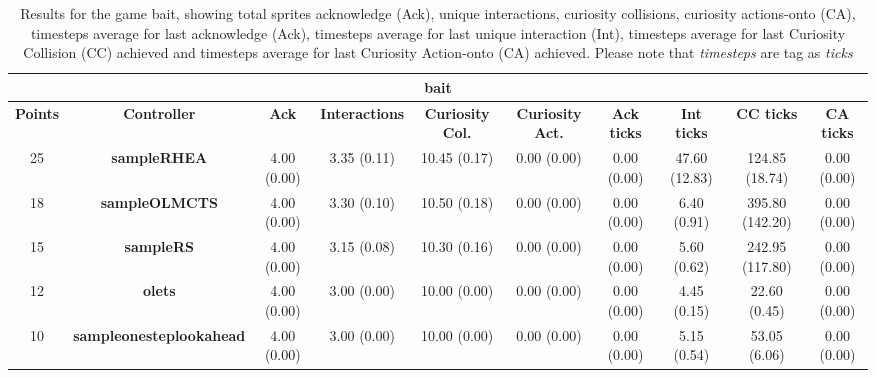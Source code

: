 \begin{table*}[!t]
\begin{center}
\begin{adjustbox}{width=1\textwidth}
\begin{tabular}{|c|c|c|c|c|c|c|c|c|c|}
\multicolumn{10}{c}{\textbf{bait}}\\
\hline
\textbf{Points} & \textbf{Controller} & \textbf{Ack} & \textbf{Interactions} & \textbf{Curiosity Col.} & \textbf{Curiosity Act.} & \textbf{Ack ticks} & \textbf{Int ticks} & \textbf{CC ticks} & \textbf{CA ticks}\\
\hline
25 & \textbf{sampleRHEA} & 4.00 (0.00) & 3.35 (0.11) & 10.45 (0.17) & 0.00 (0.00) & 0.00 (0.00) & 47.60 (12.83) & 124.85 (18.74) & 0.00 (0.00)
 \\
\hline
18 & \textbf{sampleOLMCTS} & 4.00 (0.00) & 3.30 (0.10) & 10.50 (0.18) & 0.00 (0.00) & 0.00 (0.00) & 6.40 (0.91) & 395.80 (142.20) & 0.00 (0.00)
 \\
\hline
15 & \textbf{sampleRS} & 4.00 (0.00) & 3.15 (0.08) & 10.30 (0.16) & 0.00 (0.00) & 0.00 (0.00) & 5.60 (0.62) & 242.95 (117.80) & 0.00 (0.00)
 \\
\hline
12 & \textbf{olets} & 4.00 (0.00) & 3.00 (0.00) & 10.00 (0.00) & 0.00 (0.00) & 0.00 (0.00) & 4.45 (0.15) & 22.60 (0.45) & 0.00 (0.00)
 \\
\hline
10 & \textbf{sampleonesteplookahead} & 4.00 (0.00) & 3.00 (0.00) & 10.00 (0.00) & 0.00 (0.00) & 0.00 (0.00) & 5.15 (0.54) & 53.05 (6.06) & 0.00 (0.00)
 \\
\hline
\end{tabular}
\end{adjustbox}
\caption{Results for the game bait, showing total sprites acknowledge (Ack), unique interactions, curiosity collisions, curiosity actions-onto (CA), timesteps average for last acknowledge (Ack),  timesteps average for last unique interaction (Int), timesteps average for last Curiosity Collision (CC) achieved and timesteps average for last Curiosity Action-onto (CA) achieved. Please note that \textit{timesteps} are tag as \textit{ticks}}
\label{tab:weights}
\end{center}
\end{table*}
